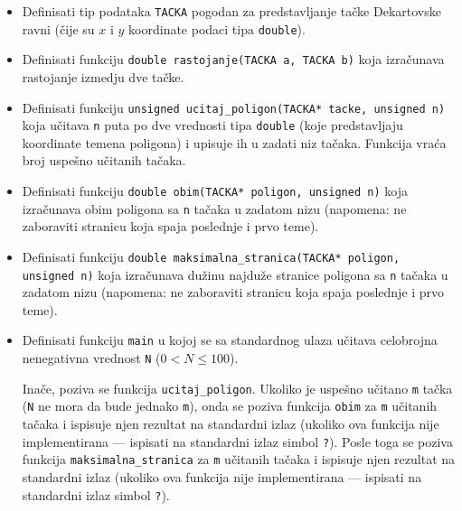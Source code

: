 \begin{Exercise}[label=p2.5_] 
\begin{itemize}
\item Definisati tip podataka \verb|TACKA| pogodan za predstavljanje ta\v cke
Dekartovske ravni (\v{c}ije su $x$ i $y$ koordinate podaci tipa \verb|double|).

\item Definisati funkciju \verb|double rastojanje(TACKA a, TACKA b)| koja
izra\v cunava rastojanje izmedju dve ta\v{c}ke.

\item Definisati funkciju \verb|unsigned ucitaj_poligon(TACKA* tacke, unsigned n)|
koja u\v citava \verb|n| puta po dve vrednosti tipa \verb|double|
 (koje predstavljaju koordinate temena poligona) i upisuje ih u zadati niz
 ta\v{c}aka. Funkcija vra\' ca broj uspe\v sno u\v citanih ta\v{c}aka.

\item Definisati funkciju \verb|double obim(TACKA* poligon, unsigned n)|
koja izra\v cunava obim poligona sa \verb|n| ta\v{c}aka u zadatom nizu
(napomena: ne zaboraviti stranicu koja spaja poslednje i prvo teme).

\item Definisati funkciju \verb|double maksimalna_stranica(TACKA* poligon, unsigned n)|
koja izra\v cunava du\v{z}inu najdu\v{z}e stranice poligona sa \verb|n| ta\v{c}aka
u zadatom nizu (napomena: ne zaboraviti stranicu koja spaja poslednje i prvo teme).

\item Definisati funkciju \verb|main| u kojoj se sa standardnog ulaza
u\v{c}itava celobrojna nenegativna vrednost \verb|N| ($0 < N \le 100$).

Ina\v{c}e, poziva se funkcija \verb|ucitaj_poligon|. Ukoliko je
uspe\v{s}no u\v{c}itano \verb|m| ta\v{c}ka (\verb|N| ne mora da
bude jednako \verb|m|), onda se poziva funkcija \verb|obim|
za \verb|m| u\v{c}itanih ta\v{c}aka i ispisuje njen rezultat
na standardni izlaz (ukoliko ova funkcija nije implementirana
--- ispisati na standardni izlaz simbol \verb|?|).
Posle toga se poziva funkcija \verb|maksimalna_stranica|
za \verb|m| u\v{c}itanih ta\v{c}aka i ispisuje njen rezultat
na standardni izlaz (ukoliko ova funkcija nije implementirana
--- ispisati na standardni izlaz simbol \verb|?|).
\end{itemize}
\end{Exercise}
\begin{Answer}[ref=p2.5_]
\end{Answer}

\iffalse
\section{Rešenja}
\shipoutAnswer
\fi

